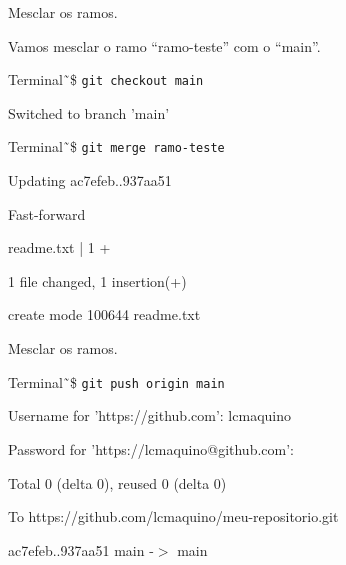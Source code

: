 \documentclass[brazil,aspectratio=169]{beamer}
\newcommand{\terminal}[1]{\textcolor{my-green}{\texttt{#1}}}
\begin{document}
\begin{frame}{Mesclar os ramos.}

Vamos mesclar o ramo ``ramo-teste'' com o ``main''.

\begin{exampleblock}{Terminal}
\~\,\$ \terminal{git checkout main}

Switched to branch 'main'
\end{exampleblock}


\begin{exampleblock}{Terminal}
\~\,\$ \terminal{git merge ramo-teste}

Updating ac7efeb..937aa51

Fast-forward

readme.txt | 1 +

1 file changed, 1 insertion(+)

create mode 100644 readme.txt
 
\end{exampleblock}

\end{frame}


\begin{frame}{Mesclar os ramos.}

\begin{exampleblock}{Terminal}
\~\,\$ \terminal{git push origin main}

Username for 'https://github.com': lcmaquino

Password for 'https://lcmaquino@github.com':

Total 0 (delta 0), reused 0 (delta 0)

To https://github.com/lcmaquino/meu-repositorio.git

ac7efeb..937aa51  main -$>$ main
 
\end{exampleblock}
\end{frame}
\end{document}
